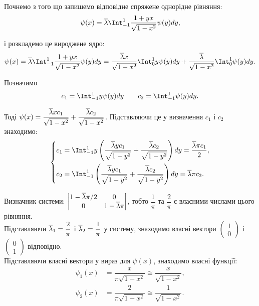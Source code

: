 \begin{solution}
    Почнемо з того що запишемо відповідне спряжене однорідне рівняння:
    \[
        \psi(x) = \conjlambda \Int_{-1}^1 \dfrac{1 + yx}{\sqrt{1 - x^2}} \psi(y) dy,
    \]
    
    і розкладемо це вироджене ядро:
    \[
        \psi(x) = \conjlambda \Int_{-1}^1 \dfrac{1 + yx}{\sqrt{1 - x^2}} \psi(y) dy =  \dfrac{\conjlambda x}{\sqrt{1 - x^2}} \Int_0^1 y \psi(y) dy + \dfrac{\conjlambda}{\sqrt{1 - x^2}} \Int_0^1 \psi(y) dy.
    \]

    Позначимо
    \[
        c_1 = \Int_{-1}^1 y \psi(y) dy \qquad c_2 = \Int_{-1}^1 \psi(y) dy.
    \]

    Тоді $\psi(x) = \dfrac{\overline{\lambda} x c_1}{\sqrt{1 - x^2}} + \dfrac{\overline{\lambda} c_2}{\sqrt{1 - x^2}}$. Підставляючи це у визначення $c_1$ і $c_2$ знаходимо:
    \begin{equation*}
        \left\{
            \begin{aligned}
                c_1 &= \Int_{-1}^1 y \left( \dfrac{\conjlambda y c_1}{\sqrt{1 - y^2}} + \dfrac{\conjlambda c_2}{\sqrt{1 - y^2}} \right) dy = \dfrac{\conjlambda \pi c_1}{2}, \\ 
                c_2 &= \Int_{-1}^1 \left( \dfrac{\conjlambda y c_1}{\sqrt{1 - y^2}} + \dfrac{\conjlambda c_2}{\sqrt{1 - y^2}} \right) dy = \conjlambda \pi c_2.
            \end{aligned}
        \right.
    \end{equation*}
    
    Визначник системи: $\begin{vmatrix} 1 - \overline{\lambda} \pi / 2 & 0 \\ 0 & 1 - \overline{\lambda} \pi \end{vmatrix}$, тобто $\dfrac 1 \pi$ та $\dfrac 2 \pi$ є власними числами цього рівняння. \\
    
    Підставляючи $\overline{\lambda}_1 = \dfrac 2 \pi$ і $\overline{\lambda}_2 = \dfrac 1 \pi$ у систему, знаходимо власні вектори $\begin{pmatrix} 1 \\ 0 \end{pmatrix}$ і $\begin{pmatrix} 0 \\ 1 \end{pmatrix}$ відповідно. \\
    
    Підставляючи власні вектори у вираз для $\psi(x)$, знаходимо власні функції:
    \begin{equation*}
        \begin{aligned}
            \psi_1(x) &= \dfrac{x}{\pi \sqrt{1 - x^2}} \cong \dfrac{x}{\sqrt{1 - x^2}}, \\
            \psi_2(x) &= \dfrac{2}{\pi \sqrt{1 - x^2}} \cong \dfrac{1}{\sqrt{1 - x^2}}.
        \end{aligned}
    \end{equation*}
    

\end{solution}
